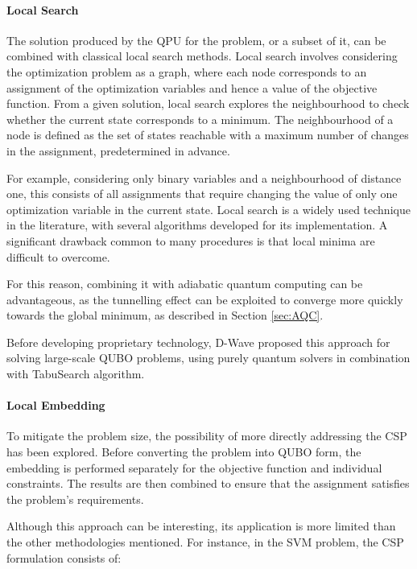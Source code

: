 \paragraph{Local Search} The solution produced by the QPU for the problem, or a subset of it, can be combined with classical local search methods. 
Local search involves considering the optimization problem as a graph, where each node corresponds to an assignment of the optimization variables and hence a value of the objective function. 
From a given solution, local search explores the neighbourhood to check whether the current state corresponds to a minimum. 
The neighbourhood of a node is defined as the set of states reachable with a maximum number of changes in the assignment, predetermined in advance. 

For example, considering only binary variables and a neighbourhood of distance one, this consists of all assignments that require changing the value of only one optimization variable in the current state.
Local search is a widely used technique in the literature, with several algorithms developed for its implementation. 
A significant drawback common to many procedures is that local minima are difficult to overcome. 

For this reason, combining it with adiabatic quantum computing can be advantageous, as the tunnelling effect can be exploited to converge more quickly towards the global minimum, as described in Section \ref{sec:AQC}.

Before developing proprietary technology, D-Wave proposed this approach for solving large-scale QUBO problems\cite{hybridsearch}, using purely quantum solvers in combination with TabuSearch algorithm\cite{tabusearch}.

\paragraph{Local Embedding} To mitigate the problem size, the possibility of more directly addressing the CSP has been explored\cite{localembedding}. 
Before converting the problem into QUBO form, the embedding is performed separately for the objective function and individual constraints. 
The results are then combined to ensure that the assignment satisfies the problem's requirements.

Although this approach can be interesting, its application is more limited than the other methodologies mentioned.
For instance, in the SVM problem, the CSP formulation consists of: 

